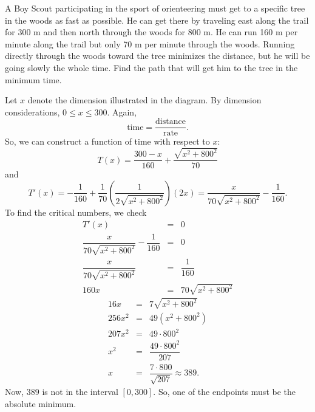\documentclass{book}
\begin{document}
\begin{Exam} A Boy Scout participating in the sport of orienteering must get to a specific tree in the woods as fast as possible. He can get there by traveling east along the trail for 300 m and then north through the woods for 800 m. He can run 160 m per minute along the trail but only 70 m per minute through the woods. Running directly through the woods toward the tree minimizes the distance, but he will be going slowly the whole time. Find the path that will get him to the tree in the minimum time.

\begin{center}
\end{center}

Let $x$  denote the dimension illustrated in the diagram. By dimension considerations, $0 \le x\le 300$. Again, \[\text{time} = \dfrac{\text{distance}}{\text{rate}}.\] So, we can construct a function of time with respect to $x$: \[T(x) = \dfrac{300-x}{160} + \dfrac{\sqrt{x^2+800^2}}{70}\] and \[T'(x) = -\dfrac{1}{160} + \dfrac{1}{70}\left(\dfrac{1}{2\sqrt{x^2+800^2}}\right)(2x) = \dfrac{x}{70\sqrt{x^2+800^2}} - \dfrac{1}{160}.\] To find the critical numbers, we check 
\begin{eqnarray*}
T'(x) &=& 0 \\
\dfrac{x}{70\sqrt{x^2+800^2}} - \dfrac{1}{160}&=& 0\\
\dfrac{x}{70\sqrt{x^2+800^2}}&=& \dfrac{1}{160}\\
160x &=& 70\sqrt{x^2+800^2}
\end{eqnarray*}
\begin{eqnarray*}
16x &=& 7\sqrt{x^2+800^2}\\
256x^2 &=& 49(x^2+800^2)\\
207x^2 &=& 49\cdot 800^2\\
x^2 &=& \dfrac{49\cdot 800^2}{207}\\
x &=& \dfrac{7\cdot 800}{\sqrt{207}} \approx 389.
\end{eqnarray*} Now, $389$ is not in the interval $[0,300]$. So, one of the endpoints must be the absolute minimum. \vspace{-10pt}


\end{Exam}
\end{document}
